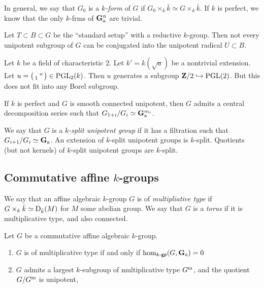 \documentclass{article}
\begin{document}
In general, we say that $G_0$ is a \emph{$k$-form} of $G$ if 
$G_0\times_k \bar k\simeq G\times_k \bar k$. If $k$ is perfect, we know that 
the only $k$-frms of $\mathbf{G}_{\mathrm{a}}^n$ are trivial. 

Let $T\subset B\subset G$ be the ``standard setup'' with a reductive 
$k$-group. Then not every unipotent subgroup of $G$ can be conjugated into 
the unipotent radical $U\subset B$. 

\begin{example}
Let $k$ be a field of characteristic $2$. Let $k'=k(\sqrt a)$ be a nontrivial 
extension. Let $u=\bigl(\begin{smallmatrix}  & a \\ 1 &  \end{smallmatrix} \bigr)\in \operatorname{PGL}_2(k)$. Then 
$u$ generates a subgroup $\mathbf{Z}/2\hookrightarrow \operatorname{PGL}(2)$. But 
this does not fit into any Borel subgroup. 
\end{example}

\begin{corollary}
If $k$ is perfect and $G$ is smooth connected unipotent, then $G$ admits a 
central decomposition series such that $G_{1+i}/G_i \simeq \mathbf{G}_{\mathrm{a}}^{m_i}$. 
\end{corollary}

We say that $G$ is a \emph{$k$-split unipotent group} if it has a filtration 
such that $G_{i+1}/G_i\simeq \mathbf{G}_{\mathrm{a}}$. An extension of $k$-split 
unipotent groups is $k$-split. Quotients (but not kernels) of $k$-split 
unipotent groups are $k$-split. 


\subsection{Commutative affine $k$-groups}

We say that an affine algebraic $k$-group $G$ is of \emph{multipliative type} 
if $G\times_k \bar k\simeq \operatorname{D}_{\bar k}(M)$ for $M$ some abelian 
group. We say that $G$ is a \emph{torus} if it is multiplicative type, and also 
connected. 

\begin{theorem}
Let $G$ be a commutative affine algebraic $k$-group. 
\begin{enumerate}
  \item $G$ is of multiplicative type if and only if $\hom_{k\textnormal{-}\mathsf{gp}}(G,\mathbf{G}_{\mathrm{a}})=0$ 
  \item $G$ admits a largest $k$-subgroup of multiplicative type $G^{\mathrm{m}}$, and 
    the quotient $G/G^{\mathrm{m}}$ is unipotent, 
\end{enumerate}
\end{theorem}
\end{document}
